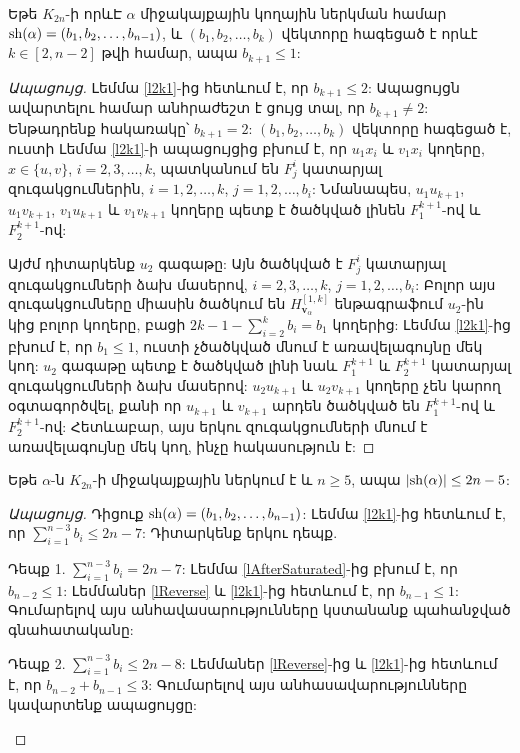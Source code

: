 \begin{hide}
\begin{lemma}
\label{lAfterSaturated}
Եթե $K_{2n}$-ի որևԷ $\alpha$ միջակայքային կողային ներկման համար ${\rm sh}(\alpha) = (b_1,b_2,\ldots, b_{n-1})$, և $(b_1,b_2,\ldots,b_k)$ վեկտորը հագեցած է որևէ $k \in [2,n-2]$ թվի համար, ապա $b_{k+1} \leq 1$:
\end{lemma}

\begin{proof}[Ապացույց]
Լեմմա \ref{l2k1}-ից հետևում է, որ $b_{k+1} \leq 2$: Ապացույցն ավարտելու համար անհրաժեշտ է ցույց տալ, որ $b_{k+1} \neq 2$: Ենթադրենք հակառակը՝ $b_{k+1} = 2$: $(b_1,b_2,\ldots,b_k)$ վեկտորը հագեցած է, ուստի Լեմմա \ref{l2k1}-ի ապացույցից բխում է, որ $u_1x_i$ և $v_1x_i$ կողերը, $x \in \{u,v\}$, $i=2,3,\ldots,k$, պատկանում են $F^i_j$ կատարյալ զուգակցումներին, $i=1,2,\ldots,k$, $j=1,2,\ldots,b_i$: Նմանապես, $u_1u_{k+1}$, $u_1v_{k+1}$, $v_1u_{k+1}$ և $v_1v_{k+1}$ կողերը պետք է ծածկված լինեն $F^{k+1}_1$-ով և $F^{k+1}_2$-ով:

Այժմ դիտարկենք $u_2$ գագաթը: Այն ծածկված է $F^i_j$ կատարյալ զուգակցումների ձախ մասերով, $i=2,3,\ldots,k$, $j=1,2,\ldots,b_i$: Բոլոր այս զուգակցումները միասին ծածկում են $H_{\mathbf{v}_\alpha}^{[1,k]}$ ենթագրաֆում $u_2$-ին կից բոլոր կողերը, բացի $2k-1 - \sum\limits_{i=2}^{k}{b_i} = b_1$ կողերից: Լեմմա \ref{l2k1}-ից բխում է, որ $b_1 \leq 1$, ուստի չծածկված մնում է առավելագույնը մեկ կող: $u_2$ գագաթը պետք է ծածկված լինի նաև $F^{k+1}_1$ և $F^{k+1}_2$ կատարյալ զուգակցումների ձախ մասերով: $u_2u_{k+1}$ և $u_2v_{k+1}$ կողերը չեն կարող օգտագործվել, քանի որ $u_{k+1}$ և $v_{k+1}$ արդեն ծածկված են $F^{k+1}_1$-ով և $F^{k+1}_2$-ով: Հետևաբար, այս երկու զուգակցումների մնում է առավելագույնը մեկ կող, ինչը հակասություն է:
\end{proof}


\begin{corollary}
\label{c2n5}
Եթե $\alpha$-ն $K_{2n}$-ի միջակայքային ներկում է և $n\geq 5$, ապա  
$|{\rm sh}(\alpha)| \leq 2n-5$:
\end{corollary}

\begin{proof}[Ապացույց]
Դիցուք ${\rm sh}(\alpha) = (b_1,b_2,\ldots, b_{n-1})$: Լեմմա \ref{l2k1}-ից հետևում է, որ $\sum\limits_{i=1}^{n-3}{b_i} \leq 2n-7$: Դիտարկենք երկու դեպք.
\begin{description}
\item{Դեպք 1.} $\sum\limits_{i=1}^{n-3}{b_i} = 2n-7$: Լեմմա \ref{lAfterSaturated}-ից բխում է, որ $b_{n-2} \leq 1$: Լեմմաներ \ref{lReverse} և \ref{l2k1}-ից հետևում է, որ $b_{n-1} \leq 1$: Գումարելով այս անհավասարությունները կստանանք պահանջված գնահատականը:
\item{Դեպք 2.} $\sum\limits_{i=1}^{n-3}{b_i} \leq 2n-8$: Լեմմաներ \ref{lReverse}-ից և \ref{l2k1}-ից հետևում է, որ $b_{n-2} + b_{n-1} \leq 3$: Գումարելով այս անհասավարությունները կավարտենք ապացույցը:
\end{description}
\end{proof}



\end{hide}
